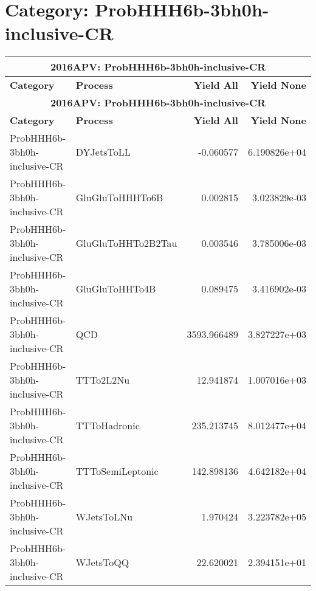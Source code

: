 \documentclass{article}
\begin{document}
\section*{Category: ProbHHH6b-3bh0h-inclusive-CR}
\begin{longtable}[c]{|l|l|r|r|}
\hline
\multicolumn{4}{|c|}{\textbf{2016APV: ProbHHH6b-3bh0h-inclusive-CR}} \\
\hline
\textbf{Category} & \textbf{Process} & \textbf{Yield All} & \textbf{Yield None} \\
\hline
\endfirsthead
\hline
\multicolumn{4}{|c|}{\textbf{2016APV: ProbHHH6b-3bh0h-inclusive-CR}} \\
\hline
\textbf{Category} & \textbf{Process} & \textbf{Yield All} & \textbf{Yield None} \\
\hline
\endhead
ProbHHH6b-3bh0h-inclusive-CR & DYJetsToLL & -0.060577 & 6.190826e+04 \\
\hline
ProbHHH6b-3bh0h-inclusive-CR & GluGluToHHHTo6B & 0.002815 & 3.023829e-03 \\
\hline
ProbHHH6b-3bh0h-inclusive-CR & GluGluToHHTo2B2Tau & 0.003546 & 3.785006e-03 \\
\hline
ProbHHH6b-3bh0h-inclusive-CR & GluGluToHHTo4B & 0.089475 & 3.416902e-03 \\
\hline
ProbHHH6b-3bh0h-inclusive-CR & QCD & 3593.966489 & 3.827227e+03 \\
\hline
ProbHHH6b-3bh0h-inclusive-CR & TTTo2L2Nu & 12.941874 & 1.007016e+03 \\
\hline
ProbHHH6b-3bh0h-inclusive-CR & TTToHadronic & 235.213745 & 8.012477e+04 \\
\hline
ProbHHH6b-3bh0h-inclusive-CR & TTToSemiLeptonic & 142.898136 & 4.642182e+04 \\
\hline
ProbHHH6b-3bh0h-inclusive-CR & WJetsToLNu & 1.970424 & 3.223782e+05 \\
\hline
ProbHHH6b-3bh0h-inclusive-CR & WJetsToQQ & 22.620021 & 2.394151e+01 \\
\hline
\end{longtable}
\end{document}
